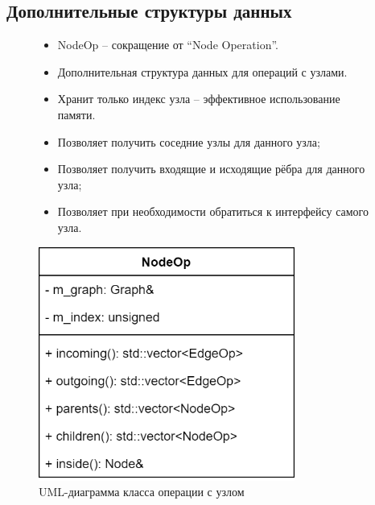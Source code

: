 \subsection{Дополнительные структуры данных}
\begin{frame}
	\begin{figure}
		\begin{minipage}{0.49\textwidth}
			\begin{itemize}
				\item NodeOp -- сокращение от ``Node Operation''.
				\item Дополнительная структура данных для операций с узлами.
				\item Хранит только индекс узла -- эффективное использование памяти.
				\item Позволяет получить соседние узлы для данного узла;
				\item Позволяет получить входящие и исходящие рёбра для данного узла;
				\item Позволяет при необходимости обратиться к интерфейсу самого узла.
			\end{itemize}
		\end{minipage}\hfill\begin{minipage}{0.49\textwidth}
			\centering
			\includegraphics[width=0.75\textwidth]{images/class.nodeop.png}
			\caption{UML-диаграмма класса операции с узлом}
		\end{minipage}
	\end{figure}
\end{frame}

